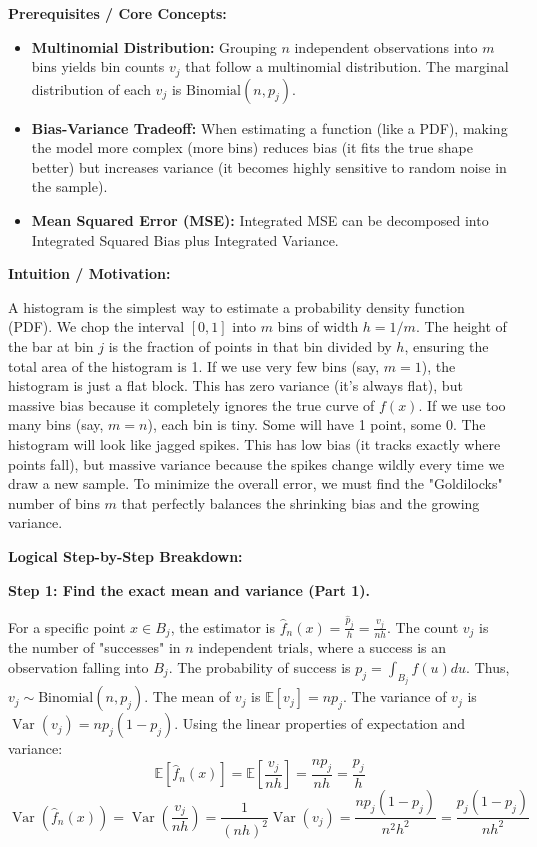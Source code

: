 \begin{solution}
\textbf{Prerequisites / Core Concepts:}
\begin{itemize}
    \item \textbf{Multinomial Distribution:} Grouping $n$ independent observations into $m$ bins yields bin counts $v_j$ that follow a multinomial distribution. The marginal distribution of each $v_j$ is $\text{Binomial}(n, p_j)$.
    \item \textbf{Bias-Variance Tradeoff:} When estimating a function (like a PDF), making the model more complex (more bins) reduces bias (it fits the true shape better) but increases variance (it becomes highly sensitive to random noise in the sample).
    \item \textbf{Mean Squared Error (MSE):} Integrated MSE can be decomposed into Integrated Squared Bias plus Integrated Variance.
\end{itemize}

\textbf{Intuition / Motivation:}

A histogram is the simplest way to estimate a probability density function (PDF). We chop the interval $[0,1]$ into $m$ bins of width $h = 1/m$. The height of the bar at bin $j$ is the fraction of points in that bin divided by $h$, ensuring the total area of the histogram is 1.
If we use very few bins (say, $m=1$), the histogram is just a flat block. This has zero variance (it's always flat), but massive bias because it completely ignores the true curve of $f(x)$.
If we use too many bins (say, $m=n$), each bin is tiny. Some will have 1 point, some 0. The histogram will look like jagged spikes. This has low bias (it tracks exactly where points fall), but massive variance because the spikes change wildly every time we draw a new sample.
To minimize the overall error, we must find the "Goldilocks" number of bins $m$ that perfectly balances the shrinking bias and the growing variance.

\textbf{Logical Step-by-Step Breakdown:}

\textbf{Step 1: Find the exact mean and variance (Part 1).}

For a specific point $x \in B_j$, the estimator is $\hat{f}_n(x) = \frac{\hat{p}_j}{h} = \frac{v_j}{nh}$.
The count $v_j$ is the number of "successes" in $n$ independent trials, where a success is an observation falling into $B_j$. The probability of success is $p_j = \int_{B_j} f(u) du$.
Thus, $v_j \sim \text{Binomial}(n, p_j)$.
The mean of $v_j$ is $\mathbb{E}[v_j] = n p_j$.
The variance of $v_j$ is $\operatorname{Var}(v_j) = n p_j (1 - p_j)$.
Using the linear properties of expectation and variance:
\[ \mathbb{E}[\hat{f}_n(x)] = \mathbb{E}\left[ \frac{v_j}{nh} \right] = \frac{n p_j}{nh} = \frac{p_j}{h} \]
\[ \operatorname{Var}(\hat{f}_n(x)) = \operatorname{Var}\left( \frac{v_j}{nh} \right) = \frac{1}{(nh)^2} \operatorname{Var}(v_j) = \frac{n p_j (1 - p_j)}{n^2 h^2} = \frac{p_j(1 - p_j)}{n h^2} \]


\end{solution}
